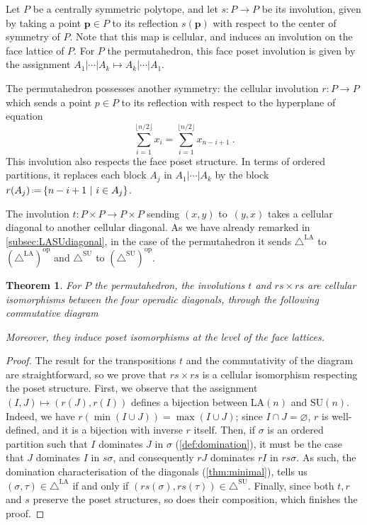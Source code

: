 \documentclass{amsart}
\newtheorem{theorem}{Theorem}[section]
\theoremstyle{definition}
\renewcommand{\b}[1]{{\boldsymbol{#1}}} %
\newcommand{\eqdef}{\mbox{\,\raisebox{0.2ex}{\scriptsize\ensuremath{\mathrm:}}\ensuremath{=}\,}} %
\renewcommand{\b}[1]{\boldsymbol{#1}} %
\newcommand{\SU}{\mathrm{SU}}
\newcommand{\LA}{\mathrm{LA}}
\newcommand{\SUD}{\triangle^{\mathrm{SU}}}
\newcommand{\LAD}{\triangle^{\mathrm{LA}}}
\newcommand{\op}{\mathrm{op}}
\begin{document}
Let $P$ be a centrally symmetric polytope, and let $s : P \to P$ be its involution, given by taking a point $\b{p} \in P$ to its reflection $s(\b{p})$ with respect to the center of symmetry of $P$. 
Note that this map is cellular, and induces an involution on the face lattice of $P$. 
For $P$ the permutahedron, this face poset involution is given by the assignment $A_1 | \cdots | A_k \mapsto A_k | \cdots | A_1$. 

The permutahedron possesses another symmetry: the cellular involution $r : P \to P$ which sends a point $p \in P$ to its reflection with respect to the hyperplane of equation \[ \sum_{i=1}^{\lfloor n/2 \rfloor}x_i = \sum_{i=1}^{\lfloor n/2 \rfloor}x_{n-i+1} \ . \]
This involution also respects the face poset structure. 
In terms of ordered partitions, it replaces each block $A_j$ in $A_1 | \cdots | A_k$ by the block $r(A_j) \eqdef \{n-i+1 \ | \ i \in A_j\}$.

The involution $t : P \times P \to P \times P$ sending $(x,y)$ to~$(y,x)$ takes a cellular diagonal to another cellular diagonal.
As we have already remarked in \cref{subsec:LASUdiagonal}, in the case of the permutahedron it sends $\LAD$ to $(\LAD)^\op$ and $\SUD$ to $(\SUD)^\op$.

\begin{theorem}
	\label{thm:bijection-operadic-diagonals}
	For $P$ the permutahedron, the involutions $t$ and $rs \times rs$ are cellular isomorphisms between the four operadic diagonals, through the following commutative diagram
	\begin{center}
		\end{center}
	Moreover, they induce poset isomorphisms at the level of the face lattices. 
\end{theorem}

\begin{proof}
The result for the transpositions $t$ and the commutativity of the diagram are straightforward, so we prove that $rs\times rs$ is a cellular isomorphism respecting the poset structure. 
First, we observe that the assignment $(I,J) \mapsto (r(J),r(I))$ defines a bijection between $\LA(n)$ and $\SU(n)$. 
Indeed, we have $r(\min(I\cup J))=\max(I\cup J)$; since $I \cap J = \varnothing$, $r$ is well-defined, and it is a bijection with inverse $r$ itself.  
Then, if $\sigma$ is an ordered partition such that $I$ dominates $J$ in $\sigma$ (\cref{def:domination}), it must be the case that $J$ dominates $I$ in $s\sigma$, and consequently $rJ$ dominates $rI$ in $rs\sigma$.
As such, the domination characterisation of the diagonals (\cref{thm:minimal}), tells us  $(\sigma,\tau) \in \LAD$ if and only if $(rs(\sigma),rs(\tau)) \in \SUD$.
Finally, since both $t,r$ and $s$ preserve the poset structures, so does their composition, which finishes the proof.
\end{proof}
\end{document}
